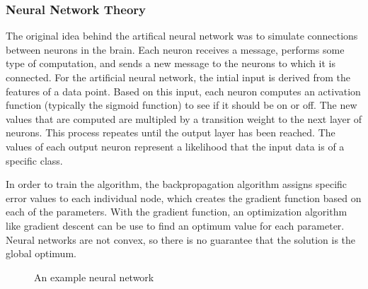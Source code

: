 \documentclass[11pt,a4paper,twocolumn]{article}
\begin{document}
\subsubsection*{Neural Network Theory}

The original idea behind the artifical neural network was to simulate connections between neurons in
the brain. Each neuron receives a message, performs some type of computation, and sends a new
message to the neurons to which it is connected. For the artificial neural network, the intial input
is derived from the features of a data point. Based on this input, each neuron computes an
activation function (typically the sigmoid function) to see if it should be on or off. The new
values that are computed are multipled by a transition weight to the next layer of neurons. This
process repeates until the output layer has been reached. The values of each output neuron represent
a likelihood that the input data is of a specific class.

In order to train the algorithm, the backpropagation algorithm assigns specific error values to each
individual node, which creates the gradient function based on each of the parameters. With the
gradient function, an optimization algorithm like gradient descent can be use to find an optimum
value for each parameter. Neural networks are not convex, so there is no guarantee that the solution
is the global optimum.

\begin{figure}[h]
\centering
\caption{An example neural network}
\end{figure}
\end{document}
